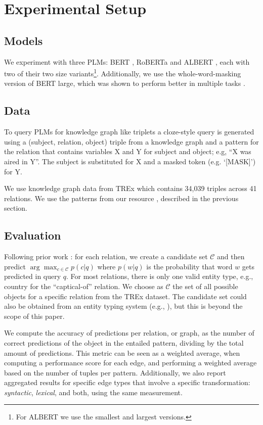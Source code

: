 \section{Experimental Setup}
\label{sec:setup}

\subsection{Models}
We experiment with three PLMs: BERT \cite{bert}, RoBERTa \cite{roberta} and ALBERT \cite{albert}, each with two of their two size variants\footnote{For ALBERT we use the smallest and largest versions.}. Additionally, we use the whole-word-masking version of BERT large, which was shown to perform better in multiple tasks \cite{talmor2019olmpics}.

\subsection{Data}

To query PLMs for knowledge graph like triplets
a cloze-style query is generated using a (subject, relation, object) triple from a knowledge graph and a pattern for the relation that contains variables X and Y for subject and object; e.g, ``X was aired in Y''. The subject is substituted for X and a masked token (e.g. `[MASK]') for Y.

We use knowledge graph data from TREx \cite{trex} which contains 34,039 triples across 41 relations.
We use the patterns from our resource \resource{}, described in the previous section.


\subsection{Evaluation}
\label{sec:eval}

Following prior work \cite{Xiong2020Pretrained, }: for each relation, we create a
candidate set $\mathcal{C}$ and then predict
$\arg\max_{c\in \mathcal{C}}p(c|q)$ where $p(w|q)$ is the probability
that word $w$ gets predicted in query $q$. For most relations,
there is only one valid entity type, e.g., country for the ``captical-of'' relation.
We choose as $\mathcal{C}$ the set of all possible objects for a specific relation from the TREx dataset.
The candidate set could also be obtained from an entity
typing system
(e.g., \cite{yaghoobzadeh-schutze-2016-intrinsic}), but this
is beyond the scope of this paper.


We compute the accuracy of predictions per relation, or graph, as the number of correct predictions of the object in the entailed pattern, dividing by the total amount of predictions. This metric can be seen as a weighted average, when computing a performance score for each edge, and performing a weighted average based on the number of tuples per pattern.
Additionally, we also report aggregated results for specific edge types that involve a specific transformation: \textit{syntactic}, \textit{lexical}, and both, using the same measurement.

